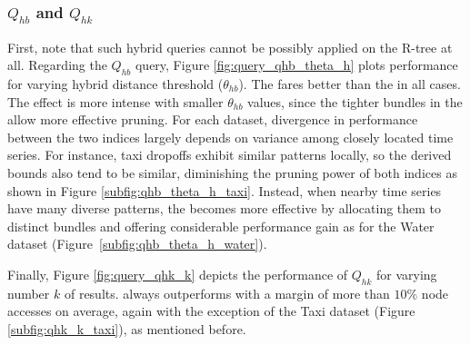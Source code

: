 \subsubsection{$Q_{hb}$ and $Q_{hk}$}
First, note that such hybrid queries cannot be possibly applied on the R-tree at all. Regarding the $Q_{hb}$ query, Figure \ref{fig:query_qhb_theta_h} plots performance for varying hybrid distance threshold ($\theta_{hb}$). The \ctsr fares better than the \tsr in all cases. The effect is more intense with smaller $\theta_{hb}$ values, since the tighter bundles in the \ctsr allow more effective pruning. For each dataset, divergence in performance between the two indices largely depends on variance among closely located time series. For instance, taxi dropoffs exhibit similar patterns locally, so the derived bounds also tend to be similar, diminishing the pruning power of both indices as shown in Figure \ref{subfig:qhb_theta_h_taxi}. Instead, when nearby time series have many diverse patterns, the \ctsr becomes more effective by allocating them to distinct bundles and offering considerable performance gain as for the Water dataset (Figure~\ref{subfig:qhb_theta_h_water}).







Finally, Figure \ref{fig:query_qhk_k} depicts the performance of $Q_{hk}$ for varying number $k$ of results. \ctsr always outperforms \tsr  with a margin of more than $10\%$ node accesses on average, again with the exception of the Taxi dataset (Figure \ref{subfig:qhk_k_taxi}), as mentioned before.